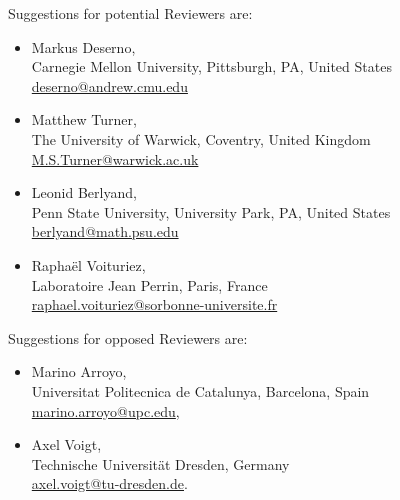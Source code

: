 \documentclass{letter}
\begin{document}
\begin{letter}{}
      Suggestions for potential Reviewers are:
      \begin{itemize}

            \item Markus Deserno,\\
                  Carnegie Mellon University, Pittsburgh, PA, United States\\
                  \href{deserno@andrew.cmu.edu}{deserno@andrew.cmu.edu}
            \item Matthew Turner,\\
                  The University of Warwick, Coventry, United Kingdom\\
                  \href{M.S.Turner@warwick.ac.uk}{M.S.Turner@warwick.ac.uk}
            \item Leonid Berlyand,\\
                  Penn State University, University Park, PA, United States\\
                  \href{berlyand@math.psu.edu}{berlyand@math.psu.edu}
            \item Rapha\"{e}l Voituriez,\\
                  Laboratoire Jean Perrin, Paris, France\\
                  \href{raphael.voituriez@sorbonne-universite.fr}{raphael.voituriez@sorbonne-universite.fr}
      \end{itemize}


      Suggestions for opposed Reviewers are:
      \begin{itemize}

            \item Marino Arroyo,\\
                  Universitat Politecnica de Catalunya, Barcelona, Spain\\
                  \href{marino.arroyo@upc.edu }{marino.arroyo@upc.edu},
            \item Axel Voigt,\\
                  Technische Universit\"{a}t Dresden, Germany\\
                  \href{axel.voigt@tu-dresden.de}{axel.voigt@tu-dresden.de}.

      \end{itemize}




\end{letter}
\end{document}
